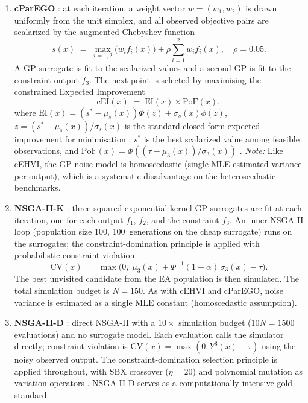 \documentclass[12pt]{article}
\theoremstyle{plain}
\theoremstyle{definition}
\theoremstyle{remark}
\begin{document}
\begin{enumerate}[label=(\arabic*),leftmargin=2.5em]
  \item \textbf{cParEGO} \citep{Knowles2006}: at each iteration, a weight
    vector $w=(w_1,w_2)$ is drawn uniformly from the unit simplex, and all
    observed objective pairs are scalarized by the augmented Chebyshev
    function
    \begin{equation*}
      s(x) \;=\; \max_{i=1,2}\bigl(w_i f_i(x)\bigr)
              + \rho\sum_{i=1}^{2} w_i f_i(x), \quad \rho=0.05.
    \end{equation*}
    A GP surrogate is fit to the scalarized values and a second GP is fit to
    the constraint output $f_3$.  The next point is selected by maximising
    the constrained Expected Improvement
    \begin{equation*}
      \mathrm{cEI}(x) \;=\; \mathrm{EI}(x)\times\mathrm{PoF}(x),
    \end{equation*}
    where $\mathrm{EI}(x)=(s^*-\mu_s(x))\Phi(z)+\sigma_s(x)\phi(z)$,
    $z=(s^*-\mu_s(x))/\sigma_s(x)$ is the standard closed-form expected
    improvement for minimisation \citep{Jones1998}, $s^*$ is the best
    scalarized value among feasible observations, and
    $\mathrm{PoF}(x)=\Phi((\tau-\mu_3(x))/\sigma_3(x))$ \citep{Gelbart2014}.
    \emph{Note:} Like cEHVI, the GP noise model is homoscedastic (single
    MLE-estimated variance per output), which is a systematic disadvantage
    on the heteroscedastic benchmarks.

  \item \textbf{NSGA-II-K} \citep{Deb2002}: three squared-exponential
    kernel GP surrogates are fit at each iteration, one for each output
    $f_1$, $f_2$, and the constraint $f_3$.  An inner NSGA-II loop
    \citep{Deb2002} (population size 100, 100~generations on the cheap
    surrogate) runs on the surrogates; the constraint-domination
    principle is applied with probabilistic constraint violation
    \begin{equation*}
      \mathrm{CV}(x) \;=\; \max\!\bigl(0,\;\mu_3(x)+\Phi^{-1}(1-\alpha)\,\sigma_3(x)-\tau\bigr).
    \end{equation*}
    The best unvisited candidate from the EA population is then simulated.
    The total simulation budget is $N=150$.  As with cEHVI and cParEGO,
    noise variance is estimated as a single MLE constant (homoscedastic assumption).

  \item \textbf{NSGA-II-D} \citep{Deb2002}: direct NSGA-II with a
    $10\times$ simulation budget ($10N=1500$ evaluations) and no surrogate
    model.  Each evaluation calls the simulator directly; constraint
    violation is $\mathrm{CV}(x)=\max(0,Y^3(x)-\tau)$ using the noisy
    observed output.  The constraint-domination selection principle
    \citep{Deb2002} is applied throughout, with SBX crossover ($\eta=20$)
    and polynomial mutation as variation operators \citep{DebAgrawal1995}.
    NSGA-II-D serves as a computationally intensive gold standard.


\end{enumerate}
\end{document}
